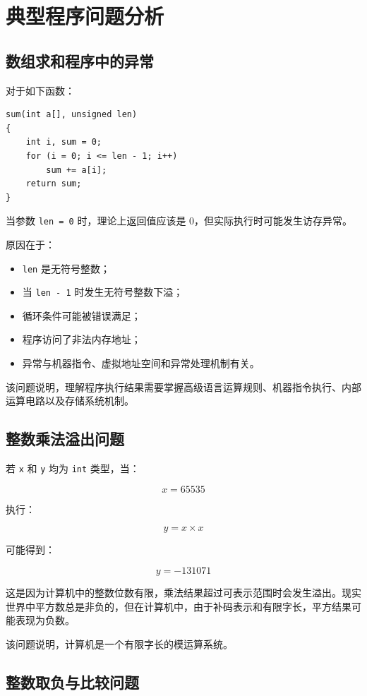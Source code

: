\documentclass[12pt,a4paper]{ctexart}
\begin{document}
\section{典型程序问题分析}

\subsection{数组求和程序中的异常}

对于如下函数：

\begin{verbatim}
sum(int a[], unsigned len)
{
    int i, sum = 0;
    for (i = 0; i <= len - 1; i++)
        sum += a[i];
    return sum;
}
\end{verbatim}

当参数 \texttt{len = 0} 时，理论上返回值应该是 0，但实际执行时可能发生访存异常。

原因在于：

\begin{itemize}
    \item \texttt{len} 是无符号整数；
    \item 当 \texttt{len - 1} 时发生无符号整数下溢；
    \item 循环条件可能被错误满足；
    \item 程序访问了非法内存地址；
    \item 异常与机器指令、虚拟地址空间和异常处理机制有关。
\end{itemize}

该问题说明，理解程序执行结果需要掌握高级语言运算规则、机器指令执行、内部运算电路以及存储系统机制。

\subsection{整数乘法溢出问题}

若 \texttt{x} 和 \texttt{y} 均为 \texttt{int} 类型，当：

\[
x = 65535
\]

执行：

\[
y = x \times x
\]

可能得到：

\[
y = -131071
\]

这是因为计算机中的整数位数有限，乘法结果超过可表示范围时会发生溢出。现实世界中平方数总是非负的，但在计算机中，由于补码表示和有限字长，平方结果可能表现为负数。

该问题说明，计算机是一个有限字长的模运算系统。

\subsection{整数取负与比较问题}
\end{document}
